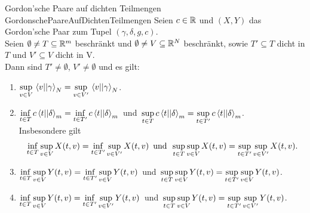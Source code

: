 \begin{lemma}{Gordon'sche Paare auf dichten Teilmengen}
             {GordonschePaareAufDichtenTeilmengen}
Seien $c\in\mathbb{R}$ und $(X,Y)$ das Gordon'sche Paar zum Tupel
$(\gamma,\delta,g,c)$.\\
Seien $\emptyset \neq T \subseteq \mathbb{R}^m$ beschränkt und
$\emptyset \neq V \subseteq \mathbb{R}^N$ beschränkt, sowie $T' \subseteq T$
dicht in $T$ und $V' \subseteq V$ dicht in V.\\
Dann sind $T'\neq \emptyset$, $V' \neq \emptyset$ und es gilt:
\begin{enumerate}[(1)]
	\item \label{GordonschePaareAufDichtenTeilmengen1}
	$ \underset{v \in V}\sup\, \left\langle v ||\gamma\right\rangle _N 
	 =\underset{v \in V'}\sup\,\left\langle v ||\gamma\right\rangle_N$.
	\item \label{GordonschePaareAufDichtenTeilmengen2}
	 $\underset{t \in T}\inf\, c\left\langle t ||\delta\right\rangle_m 
	 =\underset{t \in T'}\inf\, c\left\langle t ||\delta\right\rangle_m\,$ und $\, 
	 \underset{t \in T} \sup\, c\left\langle t ||\delta\right\rangle_m 
	  =\underset{t \in T'}\sup\, c\left\langle t ||\delta\right\rangle_m$.\\
	  Insbesondere gilt
 \[\inf_{t \in T}\sup_{v \in V}X(t, v) = \inf_{t\in T'}\sup_{v \in V'}X(t,v)\, \text{ und }
 \,\sup_{t\in T}\sup_{v\in V}X(t,v)=\sup_{t\in T'}\sup_{v\in V'}X(t,v)\text.\]
	\item \label{GordonschePaareAufDichtenTeilmengen3}
	$\underset{t \in T}\inf\,\underset{v \in V}\sup\,Y(t, v) = \underset{t\in T'}\inf\,\underset{v \in V}\sup\,Y(t, v)\,$ und
	$\,\underset{t \in T}\sup\,\underset{v \in V}\sup\,Y(t, v) = \underset{t\in T'}\sup\,\underset{v \in V}\sup\,Y(t, v)$.
	\item \label{GordonschePaareAufDichtenTeilmengen4}
	$\underset{t \in T}\inf\,\underset{v \in V}\sup\,Y(t, v) = \underset{t\in T'}\inf\,\underset{v \in V'}\sup\,Y(t,v)\,$ und
	$\,\underset{t \in T}\sup\,\underset{v \in V}\sup\,Y(t, v) = \underset{t\in T'}\sup\,\underset{v \in V'}\sup\,Y(t, v)$.
\end{enumerate}
\end{lemma}
